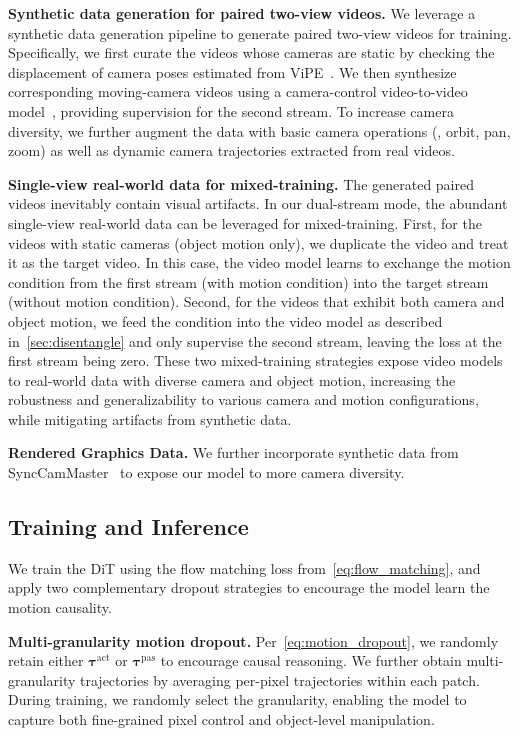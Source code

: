 \noindent\textbf{Synthetic data generation for paired two-view videos.}\quad
We leverage a synthetic data generation pipeline to generate paired two-view videos for training. Specifically, we first curate the videos whose cameras are static by checking the displacement of camera poses estimated from ViPE~\cite{huang2025vipe}.
We then synthesize corresponding moving-camera videos using a camera-control video-to-video model~\cite{fu2025plenoptic}, providing supervision for the second stream.
To increase camera diversity, we further augment the data with basic camera operations (\eg, orbit, pan, zoom) as well as dynamic camera trajectories extracted from real videos.

\noindent\textbf{Single-view real-world data for mixed-training.}\quad
The generated paired videos inevitably contain visual artifacts. In our dual-stream mode, the abundant single-view real-world data can be leveraged for mixed-training. First, for the videos with static cameras (object motion only), we duplicate the video and treat it as the target video. In this case, the video model learns to exchange the motion condition from the first stream (with motion condition) into the target stream (without motion condition). Second, for the videos that exhibit both camera and object motion, we feed the condition into the video model as described in~\cref{sec:disentangle} and only supervise the second stream, leaving the loss at the first stream being zero. These two mixed-training strategies expose video models to real-world data with diverse camera and object motion, increasing the robustness and generalizability to various camera and motion configurations, while mitigating artifacts from synthetic data.

\noindent\textbf{Rendered Graphics Data.}\quad
We further incorporate synthetic data from SyncCamMaster~\cite{bai2024syncammaster} to expose our model to more camera diversity.


\subsection{Training and Inference}
\label{sec:training}
We train the DiT using the flow matching loss from~\cref{eq:flow_matching}, and apply two complementary dropout strategies to encourage the model learn the motion causality.

\noindent\textbf{Multi-granularity motion dropout.}\quad
Per~\cref{eq:motion_dropout}, we randomly retain either
$\boldsymbol{\tau}^{\text{act}}$ or $\boldsymbol{\tau}^{\text{pas}}$ to
encourage causal reasoning. We further obtain multi-granularity trajectories by averaging per-pixel trajectories within each patch.
During training, we randomly select the granularity, enabling the model to capture
both fine-grained
pixel control and object-level manipulation.

